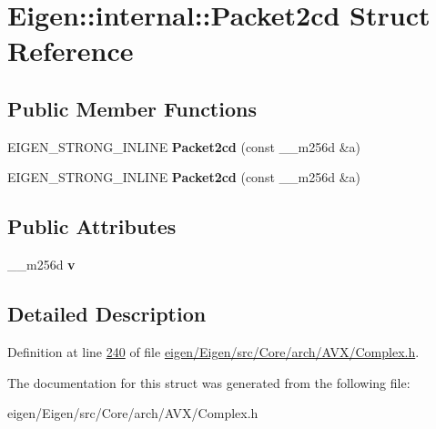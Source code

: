 \hypertarget{struct_eigen_1_1internal_1_1_packet2cd}{}\section{Eigen\+:\+:internal\+:\+:Packet2cd Struct Reference}
\label{struct_eigen_1_1internal_1_1_packet2cd}
\subsection*{Public Member Functions}
\begin{DoxyCompactItemize}
\item 
\mbox{\label{struct_eigen_1_1internal_1_1_packet2cd_a64efe67ea5b2f0a9bd10071ab02323b6}} 
E\+I\+G\+E\+N\+\_\+\+S\+T\+R\+O\+N\+G\+\_\+\+I\+N\+L\+I\+NE {\bfseries Packet2cd} (const \+\_\+\+\_\+m256d \&a)
\item 
\mbox{\label{struct_eigen_1_1internal_1_1_packet2cd_a64efe67ea5b2f0a9bd10071ab02323b6}} 
E\+I\+G\+E\+N\+\_\+\+S\+T\+R\+O\+N\+G\+\_\+\+I\+N\+L\+I\+NE {\bfseries Packet2cd} (const \+\_\+\+\_\+m256d \&a)
\end{DoxyCompactItemize}
\subsection*{Public Attributes}
\begin{DoxyCompactItemize}
\item 
\mbox{\label{struct_eigen_1_1internal_1_1_packet2cd_a1986df7e3a3f8607144c754ae23a95ce}} 
\+\_\+\+\_\+m256d {\bfseries v}
\end{DoxyCompactItemize}


\subsection{Detailed Description}


Definition at line \hyperlink{eigen_2_eigen_2src_2_core_2arch_2_a_v_x_2_complex_8h_source_l00240}{240} of file \hyperlink{eigen_2_eigen_2src_2_core_2arch_2_a_v_x_2_complex_8h_source}{eigen/\+Eigen/src/\+Core/arch/\+A\+V\+X/\+Complex.\+h}.



The documentation for this struct was generated from the following file\+:\begin{DoxyCompactItemize}
\item 
eigen/\+Eigen/src/\+Core/arch/\+A\+V\+X/\+Complex.\+h\end{DoxyCompactItemize}
